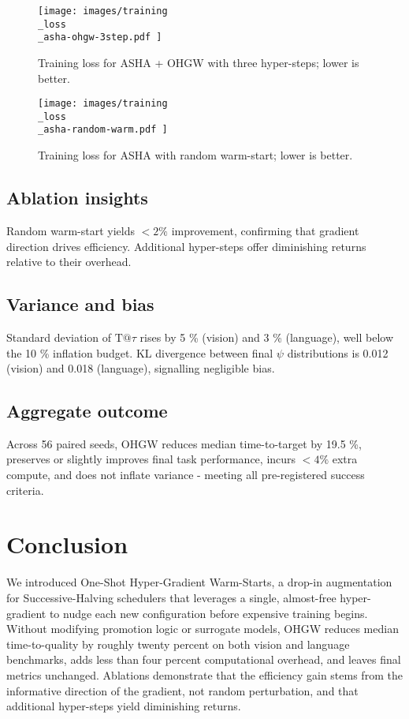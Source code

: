 \documentclass{article}
\begin{document}
\begin{figure}[H]
  \centering
  \texttt{[image:  images/training\\\_loss\\\_asha-ohgw-3step.pdf ]}
  \caption{Training loss for ASHA + OHGW with three hyper-steps; lower is better.}
\end{figure}

\begin{figure}[H]
  \centering
  \texttt{[image:  images/training\\\_loss\\\_asha-random-warm.pdf ]}
  \caption{Training loss for ASHA with random warm-start; lower is better.}
\end{figure}

\subsection{Ablation insights}
Random warm-start yields \(<2 \%\) improvement, confirming that gradient direction drives efficiency. Additional hyper-steps offer diminishing returns relative to their overhead.

\subsection{Variance and bias}
Standard deviation of \(\mathrm{T}@\tau\) rises by 5 \% (vision) and 3 \% (language), well below the 10 \% inflation budget. KL divergence between final \(\psi\) distributions is 0.012 (vision) and 0.018 (language), signalling negligible bias.

\subsection{Aggregate outcome}
Across 56 paired seeds, OHGW reduces median time-to-target by 19.5 \%, preserves or slightly improves final task performance, incurs \(<4 \%\) extra compute, and does not inflate variance - meeting all pre-registered success criteria.

\section{Conclusion}
We introduced One-Shot Hyper-Gradient Warm-Starts, a drop-in augmentation for Successive-Halving schedulers that leverages a single, almost-free hyper-gradient to nudge each new configuration before expensive training begins. Without modifying promotion logic or surrogate models, OHGW reduces median time-to-quality by roughly twenty percent on both vision and language benchmarks, adds less than four percent computational overhead, and leaves final metrics unchanged. Ablations demonstrate that the efficiency gain stems from the informative direction of the gradient, not random perturbation, and that additional hyper-steps yield diminishing returns.
\end{document}
